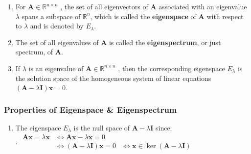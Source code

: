 \begin{enumerate}
    \item 
    \begin{definition}[Eigenspace]
        For $\bm{A} \in \mathbb{R}^{n\times n}$ , the set of all eigenvectors of $\bm{A}$ associated with an eigenvalue $\lambda $ spans a subspace of $\mathbb{R}^n$, which is called the \textbf{eigenspace} of $\bm{A}$ with respect to $\lambda $ and is denoted by $E_\lambda $.
        \hfill \cite{mfml/book/mml/Deisenroth-Faisal-Ong}
    \end{definition}

    \item 
    \begin{definition}[Eigenspectrum]
        The set of all eigenvalues of $\bm{A}$ is called the \textbf{eigenspectrum}, or just spectrum, of $\bm{A}$.
        \hfill \cite{mfml/book/mml/Deisenroth-Faisal-Ong}
    \end{definition}

    \item If $\lambda $ is an eigenvalue of $\bm{A} \in \mathbb{R}^{n\times n}$ , then the corresponding eigenspace $E_\lambda $ is the solution space of the homogeneous system of linear equations $(\bm{A} - \lambda \bm{I})\bm{x} = 0$.
    \hfill \cite{mfml/book/mml/Deisenroth-Faisal-Ong}
\end{enumerate}


\subsubsection{Properties of Eigenspace \& Eigenspectrum}

\begin{enumerate}
    \item The eigenspace $E_\lambda$  is the null space of $\bm{A} - \lambda \bm{I}$ since:
    \hfill \cite{mfml/book/mml/Deisenroth-Faisal-Ong}
    \\
    .\hfill
    $
        \begin{aligned}
            \bm{Ax} = \lambda \bm{x}
            & \Longleftrightarrow \bm{Ax} - \lambda \bm{x} = 0 \\
            & \Longleftrightarrow (\bm{A} - \lambda \bm{I})\bm{x} = 0  
            & \Longleftrightarrow \bm{x} \in \ker(\bm{A} - \lambda \bm{I})
        \end{aligned}
    $
    \hfill \cite{mfml/book/mml/Deisenroth-Faisal-Ong}
\end{enumerate}






